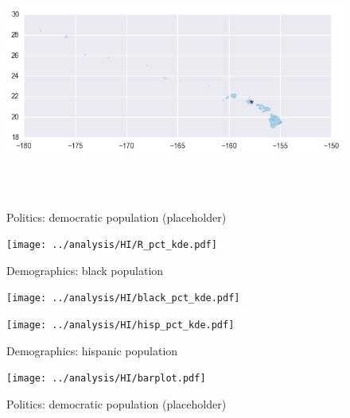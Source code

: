 \begin{figure}[htb!]
\includegraphics[width=5in,height=3in,keepaspectratio]{../maps/HI/static/0_25_after.png}
\end{figure}

\clearpage
\newpage

\begin{figure}[htb!] \centering
\caption{ Politics: democratic population (placeholder)}
\texttt{[image: ../analysis/HI/R\_pct\_kde.pdf]}
\caption{ Demographics: black population }
\texttt{[image: ../analysis/HI/black\_pct\_kde.pdf]}
\caption{ Demographics: hispanic population }
\texttt{[image: ../analysis/HI/hisp\_pct\_kde.pdf]}
\end{figure}

\clearpage
\newpage

\begin{figure}[htb!] \centering
\caption{ Politics: democratic population (placeholder)}
\texttt{[image: ../analysis/HI/barplot.pdf]}
\end{figure}

\clearpage
\newpage

